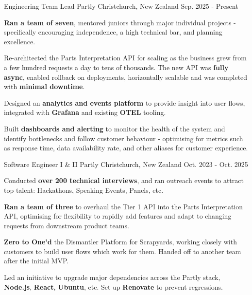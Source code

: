 
\begin{cventries}
  \cventry
    {Engineering Team Lead}
    {Partly}
    {Christchurch, New Zealand}
    {Sep. 2025 - Present}
    {
      \begin{cvitems}
        \item {\textbf{Ran a team of seven}, mentored juniors through major individual projects - specifically encouraging independence, a high technical bar, and planning excellence.}
        \item {Re-architected the Parts Interpretation API for scaling as the business grew from a few hundred requests a day to tens of thousands. The new API was \textbf{fully async}, enabled rollback on deployments, horizontally scalable and was completed with \textbf{minimal downtime}.}
        \item {Designed an \textbf{analytics and events platform} to provide insight into user flows, integrated with \textbf{Grafana} and existing \textbf{OTEL} tooling.}
        \item {Built \textbf{dashboards and alerting} to monitor the health of the system and identify bottlenecks and follow customer behaviour - optimising for metrics such as response time, data availability rate, and other aliases for customer experience.}
      \end{cvitems}
    }

  \cventry
    {Software Engineer I \& II}
    {Partly}
    {Christchurch, New Zealand}
    {Oct. 2023 - Oct. 2025}
    {
      \begin{cvitems}
        \item {Conducted \textbf{over 200 technical interviews}, and ran outreach events to attract top talent: Hackathons, Speaking Events, Panels, etc.}
        \item {\textbf{Ran a team of three} to overhaul the Tier 1 API into the Parts Interpretation API, optimising for flexibility to rapidly add features and adapt to changing requests from downstream product teams.}
        \item {\textbf{Zero to One'd} the Dismantler Platform for Scrapyards, working closely with customers to build user flows which work for them. Handed off to another team after the initial MVP.}
        \item {Led an initiative to upgrade major dependencies across the Partly stack, \textbf{Node.js}, \textbf{React}, \textbf{Ubuntu}, etc. Set up \textbf{Renovate} to prevent regressions.}
      \end{cvitems}
    }


\end{cventries}
